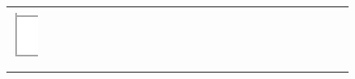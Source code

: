 \documentclass[10pt]{article}
\begin{document}
\begin{center}
\begin{tabular}{|c|c|c|c|c|c|c|c|c|c|c|c|c|c|c|c|c|c|c|c|c|c|c|c|c|c|c|c|}
 &  &  &  &  &  &  &  &  &  &  &  &  &  &  &  &  &  &  &  &  &  &  &  &  &  &  &  \\
\hline
 &  &  &  &  &  &  &  &  &  &  &  &  &  &  &  &  &  &  &  &  &  &  &  &  &  &  &  \\
\hline
\includegraphics[max width=\textwidth]{2024_11_21_51cb67544fb9b029f01cg-05}
 &  &  &  &  &  &  &  &  &  &  &  &  &  &  &  &  &  &  &  &  &  &  &  &  &  &  &  \\
\hline
 &  &  &  &  &  &  &  &  &  &  &  &  &  &  &  &  &  &  &  &  &  &  &  &  &  &  &  \\
\hline
 &  &  &  &  &  &  &  &  &  &  &  &  &  &  &  &  &  &  &  &  &  &  &  &  &  &  &  \\

\end{tabular}
\end{center}
\end{document}
